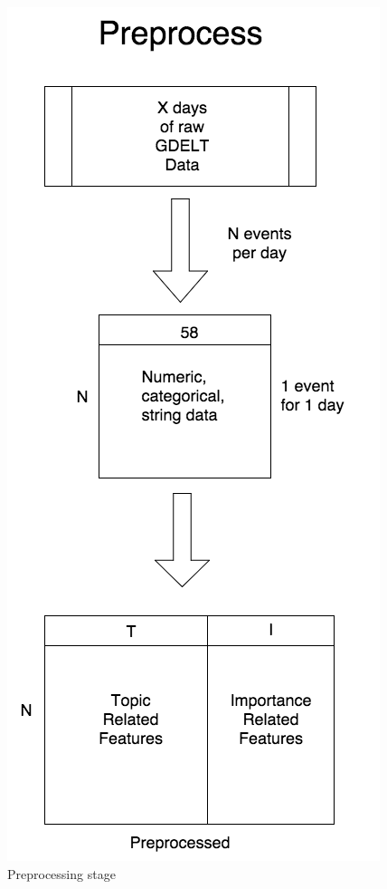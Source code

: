\begin{figure}[ht]
\vskip 0.2in
\begin{center}
\centerline{\includegraphics[scale=0.15]{images/preprocess_vertical.png}}
\caption{Preprocessing stage}
\end{center}
\vskip -0.2in
\label{fig:preprocess}
\end{figure}


